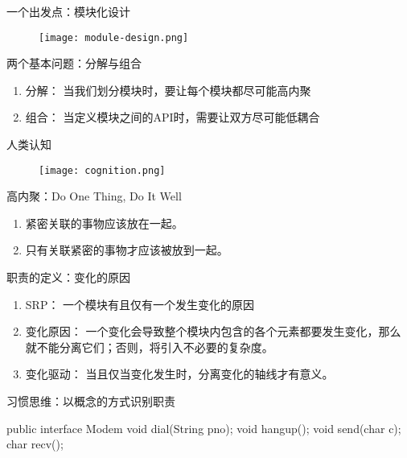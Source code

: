 \begin{frame}{一个出发点：模块化设计}
  \begin{figure}
    \centering
    \texttt{[image: module-design.png]}
  \end{figure}
\end{frame}

\begin{frame}{两个基本问题：分解与组合}
\begin{enumerate}
  \item \alert{分解：} 当我们划分模块时，要让每个模块都尽可能高内聚
  \item \alert{组合：} 当定义模块之间的API时，需要让双方尽可能低耦合 
\end{enumerate}
\end{frame}

\begin{frame}{人类认知}
  \begin{figure}
    \centering
    \texttt{[image: cognition.png]}
  \end{figure}
\end{frame}

\begin{frame}{高内聚：Do One Thing, Do It Well}
\begin{enumerate}
  \item \alert{紧密关联的事物应该放在一起。}
  \item \alert{只有关联紧密的事物才应该被放到一起。}  
\end{enumerate}
\end{frame}

\begin{frame}{职责的定义：变化的原因}
\begin{enumerate}
  \item \alert{SRP：} 一个模块有且仅有一个发生变化的原因
  \item \alert{变化原因：} 一个变化会导致整个模块内包含的各个元素都要发生变化，那么就不能分离它们；否则，将引入不必要的复杂度。
  \item \alert{变化驱动：} 当且仅当变化发生时，分离变化的轴线才有意义。
\end{enumerate}
\end{frame}

\begin{frame}[fragile]{习惯思维：以概念的方式识别职责}
  \begin{java}
public interface Modem {
  void dial(String pno);
  void hangup();
  void send(char c);
  char recv(); 
}
  \end{java}
\end{frame}

